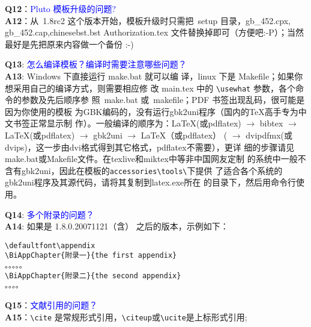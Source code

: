 \noindent \textbf{Q12}：\textcolor{blue}{Pluto 模板升级的问题?}\\
\textbf{A12}：从~1.8rc2 这个版本开始，模板升级时只需把~setup 目录，gb\_452.cpx, gb\_452.cap,chinesebst.bst Authorization.tex 文件替换掉即可（方便吧:-P）；当然最好是先把原来内容做一个备份 :-)

\noindent \textbf{Q13}: \textcolor{blue}{怎么编译模板？编译时需要注意哪些问题？}\\
\textbf{A13}: Windows 下直接运行 make.bat 就可以编
译，linux 下是 Makefile；如果你想采用自己的编译方式，则需要相应修
改 main.tex 中的 \verb+\usewhat+ 参数，各个命令的参数及先后顺序参
照~make.bat 或~makefile；PDF 书签出现乱码，很可能是因为你使用的模板
为GBK编码的，没有运行gbk2uni程序（国内的TeX高手专为中文书签正常显示制
作）。一般编译的顺序为：LaTeX(或pdflatex) $\rightarrow$ bibtex $\rightarrow$
LaTeX(或pdflatex) $\rightarrow$ gbk2uni $\rightarrow$ LaTeX（或pdflatex） ( $\rightarrow$
dvipdfmx(或dvips)，这一步由dvi格式得到其它格式，pdflatex不需要），更详
细的步骤请见make.bat或Makefile文件。在texlive和miktex中等非中国网友定制
的系统中一般不含有gbk2uni，因此在模板的\verb|accessories\tools\|下提供
了适合各个系统的gbk2uni程序及其源代码，请将其复制到latex.exe所在
的目录下，然后用命令行使用。

\noindent \textbf{Q14}: \textcolor{blue}{多个附录的问题？}\\
\textbf{A14}: 如果是 1.8.0.20071121（含） 之后的版本，示例如下：
\begin{verbatim}
\defaultfont\appendix
\BiAppChapter{附录一}{the first appendix}
。。。。。
\BiAppChapter{附录二}{the second appendix}
。。。。
\end{verbatim}

\noindent \textbf{Q15}：\textcolor{blue}{文献引用的问题？ }\\
\textbf{A15}：\verb+\cite+ 是常规形式引用，\verb+\citeup+或\verb+\ucite+是上标形式引用;


